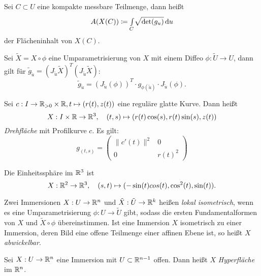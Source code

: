 \documentclass{cheat-sheet}
\begin{document}
\begin{defn}
  Sei $C \subset U$ eine kompakte messbare Teilmenge, dann heißt
  \[ A(X(C)) \coloneqq {\textstyle \int\limits_{C}^{}}  \sqrt{\det(g_u)}  \,\mathrm{d} u \]
  der Flächeninhalt von $X(C)$.
\end{defn}

\begin{satz}
  Sei $\tilde{X} = X \circ \phi$ eine Umparametrisierung von $X$ mit einem Diffeo $\phi : \tilde{U} \to U$, dann gilt für $\tilde{g}_{\tilde{u}} = (J_{\tilde{u}} \tilde{X})^T (J_{\tilde{u}} \tilde{X})$:
  \[ \tilde{g}_{\tilde{u}} = (J_{\tilde{u}}(\phi))^T \cdot g_{\phi(\tilde{u})} \cdot J_{\tilde{u}}(\phi). \]
\end{satz}

\begin{bsp}[Drehfläche]
  Sei $c : I \to \mathbb{R}_{> 0} \times \mathbb{R}, t \mapsto (r(t), z(t))$ eine reguläre glatte Kurve. Dann heißt
  \[ X : I \times \mathbb{R} \to \mathbb{R}^3, \quad (t, s) \mapsto (r(t) \cos(s), r(t) \sin(s), z(t)) \]
  \emph{Drehfläche} mit Profilkurve $c$. Es gilt:
  \[ g_{(t, s)} = \begin{pmatrix} \| c'(t) \|^2 & 0 \\ 0 & r(t)^2 \end{pmatrix} \]
\end{bsp}

\begin{bsp}[Kugelfläche] Die Einheitssphäre im $\mathbb{R}^3$ ist
\[ X : \mathbb{R}^2 \to \mathbb{R}^3, \quad (s, t) \mapsto (- \sin(t) cos(t), \cos^2(t), \sin(t)). \]
\end{bsp}

\begin{defn}
  Zwei Immersionen $X : U \to \mathbb{R}^n$ und $\tilde{X} : \tilde{U} \to \mathbb{R}^k$ heißen \emph{lokal isometrisch}, wenn es eine Umparametrisierung $\phi : U \to \tilde{U}$ gibt, sodass die ersten Fundamentalformen von $X$ und $\tilde{X} \circ \phi$ übereinstimmen. Ist eine Immersion $X$ isometrisch zu einer Immersion, deren Bild eine offene Teilmenge einer affinen Ebene ist, so heißt $X$ \emph{abwickelbar}.
\end{defn}


\begin{defn}
  Sei $X : U \to \mathbb{R}^n$ eine Immersion mit $U \subset \mathbb{R}^{n-1}$ offen. Dann heißt $X$ \emph{Hyperfläche} im $\mathbb{R}^n$.
\end{defn}
\end{document}
